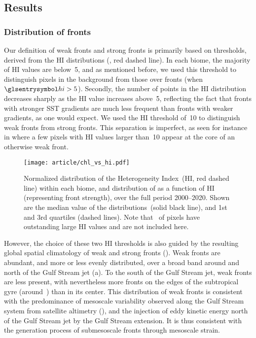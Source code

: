 \subsection{Results}

\subsubsection{Distribution of fronts}

Our definition of weak fronts and strong fronts is primarily based on thresholds, derived from the HI distributions (, red dashed line).
In each biome, the majority of HI values are below~5, and as mentioned before, we used this threshold to distinguish pixels in the background from those over fronts (when \(\am{hi} > 5\)).
Secondly, the number of points in the HI distribution decreases sharply as the HI value increases above~5, reflecting the fact that fronts with stronger SST gradients are much less frequent than fronts with weaker gradients, as one would expect.
We used the HI threshold of~10 to distinguish weak fronts from strong fronts.
This separation is imperfect, as seen for instance in  where a few pixels with HI values larger than~10 appear at the core of an otherwise weak front.

\begin{figure}
  \centering
  \texttt{[image: article/chl\_vs\_hi.pdf]}
  \caption[Distribution of  against ]{%
    Normalized distribution of the Heterogeneity Index~(HI, red dashed line) within each biome, and distribution of  as a function of HI (representing front strength), over the full period 2000--2020.
    Shown are the median value of the  distributions~(solid black line), and 1st and 3rd quartiles (dashed lines).
    Note that~ of pixels have outstanding large HI values and are not included here.
  }%
  \label{fig:chl-vs-hi}
\end{figure}

However, the choice of these two HI thresholds is also guided by the resulting global spatial climatology of weak and strong fronts ().
Weak fronts are abundant, and more or less evenly distributed, over a broad band around and north of the Gulf Stream jet (a).
To the south of the Gulf Stream jet, weak fronts are less present, with nevertheless more fronts on the edges of the subtropical gyre (around~) than in its center.
This distribution of weak fronts is consistent with the predominance of mesoscale variability observed along the Gulf Stream system from satellite altimetry (\cite{zhai_2008}), and the injection of eddy kinetic energy north of the Gulf Stream jet by the Gulf Stream extension.
It is thus consistent with the generation process of submesoscale fronts through mesoscale strain.

